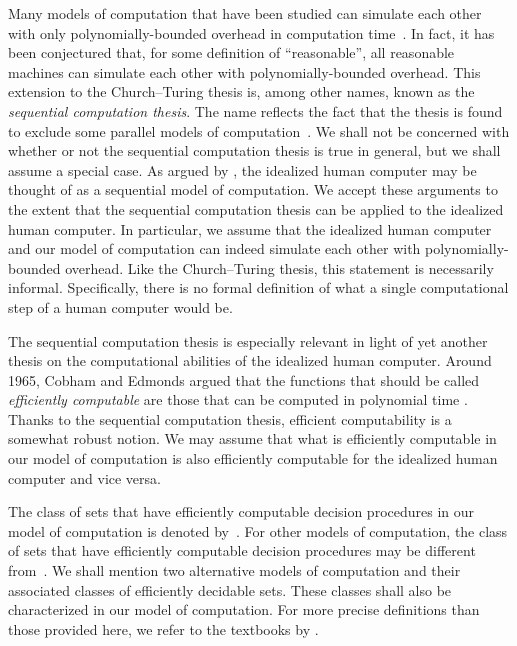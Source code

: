 Many models of computation that have been studied can simulate each other with only polynomially-bounded overhead in computation time~\parencite{vanemdeboas1990machine}.
In fact, it has been conjectured that, for some definition of \enquote{reasonable}, all reasonable machines can simulate each other with polynomially-bounded overhead.
This extension to the Church--Turing thesis is, among other names, known as the \emph{sequential computation thesis}.
The name reflects the fact that the thesis is found to exclude some parallel models of computation~\parencite{parberry1986parallel,vanemdeboas1990machine}.
We shall not be concerned with whether or not the sequential computation thesis is true in general, but we shall assume a special case.
As argued by \textcite{turing1937computable}, the idealized human computer may be thought of as a sequential model of computation.
We accept these arguments to the extent that the sequential computation thesis can be applied to the idealized human computer.
In particular, we assume that the idealized human computer and our model of computation can indeed simulate each other with polynomially-bounded overhead.
Like the Church--Turing thesis, this statement is necessarily informal.
Specifically, there is no formal definition of what a single computational step of a human computer would be.

The sequential computation thesis is especially relevant in light of yet another thesis on the computational abilities of the idealized human computer.
Around 1965, Cobham and Edmonds argued that the functions that should be called \emph{efficiently computable} are those that can be computed in polynomial time \parencite[see also][]{goldreich2008computational}.
Thanks to the sequential computation thesis, efficient computability is a somewhat robust notion.
We may assume that what is efficiently computable in our model of computation is also efficiently computable for the idealized human computer and vice versa.

The class of sets that have efficiently computable decision procedures in our model of computation is denoted by~.
For other models of computation, the class of sets that have efficiently computable decision procedures may be different from~.
We shall mention two alternative models of computation and their associated classes of efficiently decidable sets.
These classes shall also be characterized in our model of computation.
For more precise definitions than those provided here, we refer to the textbooks by \textcite{arora2009computational,goldreich2008computational}.


